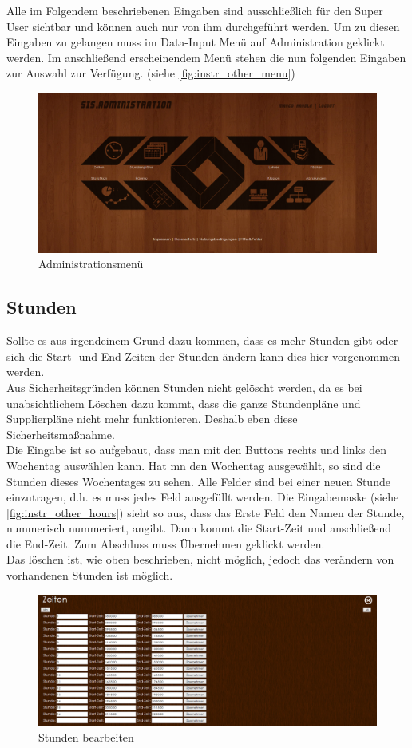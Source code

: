 Alle im Folgendem beschriebenen Eingaben sind ausschließlich für den Super User sichtbar und können auch nur von ihm durchgeführt werden. Um zu diesen Eingaben zu gelangen muss im Data-Input Menü auf Administration geklickt werden. Im anschließend erscheinendem Menü stehen die nun folgenden Eingaben zur Auswahl zur Verfügung. (siehe \autoref{fig:instr_other_menu})
\begin{figure}[H]
\centering
\includegraphics[keepaspectratio=true, width=17cm]{images/screenshots/admin_menu.png}
\caption{Administrationsmenü}
\label{fig:instr_other_menu}
\end{figure}
\subsection{Stunden}
Sollte es aus irgendeinem Grund dazu kommen, dass es mehr Stunden gibt oder sich die Start- und End-Zeiten der Stunden ändern kann dies hier vorgenommen werden.\\
Aus Sicherheitsgründen können Stunden nicht gelöscht werden, da es bei unabsichtlichem Löschen dazu kommt, dass die ganze Stundenpläne und Supplierpläne nicht mehr funktionieren. Deshalb eben diese Sicherheitsmaßnahme.\\
Die Eingabe ist so aufgebaut, dass man mit den Buttons rechts und links den Wochentag auswählen kann. Hat mn den Wochentag ausgewählt, so sind die Stunden dieses Wochentages zu sehen. Alle Felder sind bei einer neuen Stunde einzutragen, d.h. es muss jedes Feld ausgefüllt werden. Die Eingabemaske (siehe \autoref{fig:instr_other_hours}) sieht so aus, dass das Erste Feld den Namen der Stunde, nummerisch nummeriert, angibt. Dann kommt die Start-Zeit und anschließend die End-Zeit. Zum Abschluss muss Übernehmen geklickt werden.\\
Das löschen ist, wie oben beschrieben, nicht möglich, jedoch das verändern von vorhandenen Stunden ist möglich. 
\begin{figure}[H]
\centering
\includegraphics[keepaspectratio=true, width=17cm]{images/screenshots/hours_input.png}
\caption{Stunden bearbeiten}
\label{fig:instr_other_hours}
\end{figure}
